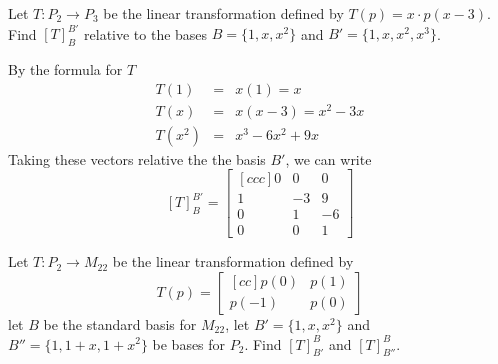 \ii Let $T:P_2\rightarrow P_3$ be the linear transformation defined by $T(p)=x\cdot p(x-3)$. Find $[T]_{B}^{B'}$ relative to the bases $B=\{1,x,x^2\}$ and $B' = \{1,x,x^2,x^3\}$.
\\
\begin{solution}
\noindent By the formula for $T$
\begin{eqnarray*}
T(1) &=& x(1) = x\\
T(x) &=& x(x-3) = x^2 - 3x\\
T(x^2) &=& x^3-6x^2+9x
\end{eqnarray*}
Taking these vectors relative the the basis $B'$, we can write
$$
[T]_{B}^{B'} = 
\begin{bmatrix}[ccc]
0&0&0\\
1&-3&9\\
0&1&-6\\
0&0&1
\end{bmatrix}
$$
\end{solution}
\ii Let $T:P_2 \rightarrow M_{22}$ be the linear transformation defined by
$$
T(p) =
\begin{bmatrix}[cc]
p(0)&p(1)\\
p(-1)&p(0)
\end{bmatrix}
$$
let $B$ be the standard basis for $M_{22}$, let $B'=\{1,x,x^2\}$ and $B''=\{1,1+x,1+x^2\}$ be bases for $P_2$. Find $[T]_{B'}^{B}$ and $[T]_{B''}^{B}$.
\\
